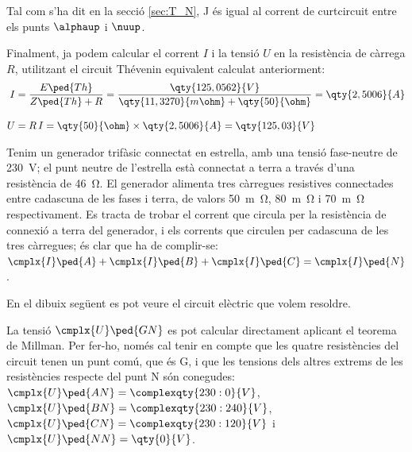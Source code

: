 \begin{exemple}
    Tal com s'ha dit en la secció \ref{sec:T_N}, J és igual al
    corrent de curtcircuit entre els punts $\alphaup$ i $\nuup$.

    Finalment, ja podem calcular el corrent $I$ i la tensió $U$ en la
    resistència de càrrega $R$, utilitzant el circuit Thévenin equivalent calculat anteriorment:
    \begin{align*}
        I &= \frac{E\ped{Th}}{Z\ped{Th} + R} = \frac{\qty{125,0562}{V}}
        {\qty{11,3270}{m\ohm} + \qty{50}{\ohm}} = \qty{2,5006}{A} \\[2ex]
        U &=  R \,I = \qty{50}{\ohm} \times \qty{2,5006}{A} =
        \qty{125,03}{V}
    \end{align*}
\end{exemple}


\begin{exemple}\label{ex:MillmanTrifNeutre}
	\addcontentsxms{\MillmanTrifNeutre}	
    Tenim un generador trifàsic connectat en estrella, amb una tensió fase-neutre de \qty{230}{V}; el punt neutre de l'estrella està connectat a terra a través d'una resistència de \qty{46}{\ohm}. El generador alimenta tres càrregues resistives connectades entre cadascuna de les fases i terra, de valors \qty{50}{m\ohm}, \qty{80}{m\ohm} i \qty{70}{m\ohm} respectivament. Es tracta de trobar el corrent que circula per la resistència de connexió a terra del generador, i els corrents que circulen per cadascuna de les tres càrregues; és clar que ha de complir-se: $\cmplx{I}\ped{A} + \cmplx{I}\ped{B} + \cmplx{I}\ped{C} = \cmplx{I}\ped{N}$.

    En el dibuix  següent es pot veure el circuit elèctric que  volem resoldre.

	 \begin{center}
		
	\end{center}

    La tensió $\cmplx{U}\ped{GN}$ es pot calcular directament aplicant el teorema de Millman. Per fer-ho, només cal tenir en compte que les quatre resistències del circuit tenen un punt comú, que és G, i que les tensions dels altres extrems de les resistències respecte del punt N són conegudes: $\cmplx{U}\ped{AN}=\complexqty{230:0}{V}$, $\cmplx{U}\ped{BN}=\complexqty{230:240}{V}$, $\cmplx{U}\ped{CN}=\complexqty{230:120}{V}$ i  $\cmplx{U}\ped{NN}=\qty{0}{V}$.


\end{exemple}
